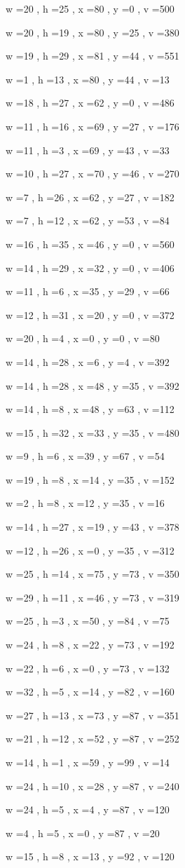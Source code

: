 \documentclass[11pt]{article}
\begin{document}
w =20 , h =25 , x =80 , y =0 , v =500
\par
w =20 , h =19 , x =80 , y =25 , v =380
\par
w =19 , h =29 , x =81 , y =44 , v =551
\par
w =1 , h =13 , x =80 , y =44 , v =13
\par
w =18 , h =27 , x =62 , y =0 , v =486
\par
w =11 , h =16 , x =69 , y =27 , v =176
\par
w =11 , h =3 , x =69 , y =43 , v =33
\par
w =10 , h =27 , x =70 , y =46 , v =270
\par
w =7 , h =26 , x =62 , y =27 , v =182
\par
w =7 , h =12 , x =62 , y =53 , v =84
\par
w =16 , h =35 , x =46 , y =0 , v =560
\par
w =14 , h =29 , x =32 , y =0 , v =406
\par
w =11 , h =6 , x =35 , y =29 , v =66
\par
w =12 , h =31 , x =20 , y =0 , v =372
\par
w =20 , h =4 , x =0 , y =0 , v =80
\par
w =14 , h =28 , x =6 , y =4 , v =392
\par
w =14 , h =28 , x =48 , y =35 , v =392
\par
w =14 , h =8 , x =48 , y =63 , v =112
\par
w =15 , h =32 , x =33 , y =35 , v =480
\par
w =9 , h =6 , x =39 , y =67 , v =54
\par
w =19 , h =8 , x =14 , y =35 , v =152
\par
w =2 , h =8 , x =12 , y =35 , v =16
\par
w =14 , h =27 , x =19 , y =43 , v =378
\par
w =12 , h =26 , x =0 , y =35 , v =312
\par
w =25 , h =14 , x =75 , y =73 , v =350
\par
w =29 , h =11 , x =46 , y =73 , v =319
\par
w =25 , h =3 , x =50 , y =84 , v =75
\par
w =24 , h =8 , x =22 , y =73 , v =192
\par
w =22 , h =6 , x =0 , y =73 , v =132
\par
w =32 , h =5 , x =14 , y =82 , v =160
\par
w =27 , h =13 , x =73 , y =87 , v =351
\par
w =21 , h =12 , x =52 , y =87 , v =252
\par
w =14 , h =1 , x =59 , y =99 , v =14
\par
w =24 , h =10 , x =28 , y =87 , v =240
\par
w =24 , h =5 , x =4 , y =87 , v =120
\par
w =4 , h =5 , x =0 , y =87 , v =20
\par
w =15 , h =8 , x =13 , y =92 , v =120
\par
\newpage
\end{document}

